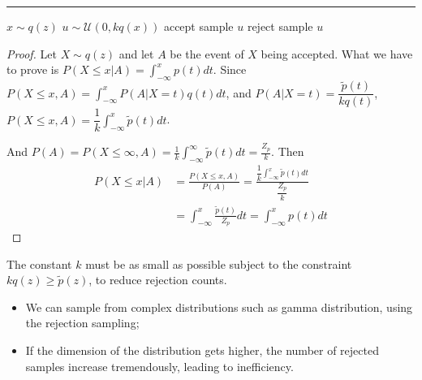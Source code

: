 \documentclass{article}
\begin{document}
        \begin{algorithm}[H]
            \DontPrintSemicolon
            \caption{Rejection sampling algorithm}


            \BlankLine
            \hrule

            {
                $x \sim q(z)$\;
                $u \sim \mathcal U(0, kq(x))$\;
                {accept sample $u$}
                {reject sample $u$}
            }

        \end{algorithm}

        \begin{proof}
            Let $X \sim q(z)$ and let $A$ be the event of $X$ being accepted. What we have to prove is $\displaystyle{P(X \leq x | A) = \int_{-\infty}^{x} p(t)dt}$.
            Since $\displaystyle{P(X \leq x, A)=\int_{-\infty}^{x}P(A | X=t)q(t)dt}$, and $\displaystyle{P(A|X=t)=\dfrac{\tilde{p}(t)}{kq(t)}}$,
            $\displaystyle{P(X \leq x, A)=\dfrac{1}{k}\int_{-\infty}^{x}\tilde{p}(t)dt}$.
            
            And $\displaystyle{P(A) = P(X \leq \infty, A)=\frac{1}{k}\int_{-\infty}^{\infty}\tilde{p}(t)dt=\frac{Z_p}{k}}$. Then
            \begin{align*}
                P(X \leq x | A) &= \frac{P(X \leq x, A)}{P(A)} = \frac{\dfrac{1}{k}\displaystyle{\int_{-\infty}^{x}}\tilde{p}(t)dt}{\dfrac{Z_p}{k}} \\
                &= \int_{-\infty}^{x}\frac{\tilde{p}(t)}{Z_p}dt = \int_{-\infty}^{x} p(t)dt
            \end{align*}
        \end{proof}
        
        The constant $k$ must be as small as possible subject to the constraint $kq(z) \geq \tilde{p}(z)$, to reduce rejection counts.
        \begin{itemize}
            \item We can sample from complex distributions such as gamma distribution, using the rejection sampling;
            \item If the dimension of the distribution gets higher, the number of rejected samples increase tremendously, leading to inefficiency.
        \end{itemize}
\end{document}
